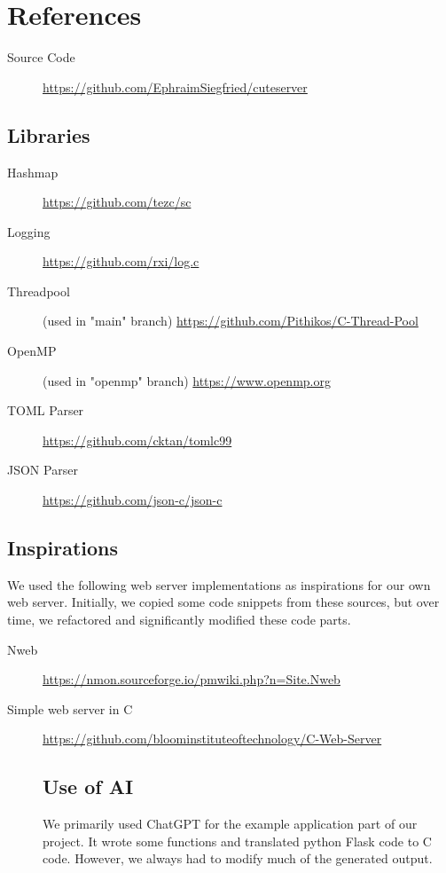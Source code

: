 \section*{References}
\begin{description}
    \item[Source Code]\url{https://github.com/EphraimSiegfried/cuteserver}
\end{description}

\subsection*{Libraries}
\begin{description}
    \item[Hashmap] \url{https://github.com/tezc/sc}
    \item[Logging] \url{https://github.com/rxi/log.c}
    \item[Threadpool] (used in "main" branch) \url{https://github.com/Pithikos/C-Thread-Pool}
    \item[OpenMP] (used in "openmp" branch) \url{https://www.openmp.org}
    \item[TOML Parser] \url{https://github.com/cktan/tomlc99}
    \item[JSON Parser] \url{https://github.com/json-c/json-c}
\end{description}

\subsection*{Inspirations}

We used the following web server implementations as inspirations for our own web server. Initially, we copied some code snippets from these sources, but over time, we refactored and significantly modified these code parts.

\begin{description}
    \item[Nweb] \url{https://nmon.sourceforge.io/pmwiki.php?n=Site.Nweb}
\item[Simple web server in C] \url{https://github.com/bloominstituteoftechnology/C-Web-Server}

\subsection*{Use of AI}
We primarily used ChatGPT for the example application part of our project. It wrote some functions and translated python Flask code to C code. However, we always had to modify much of the generated output.

\end{description}

